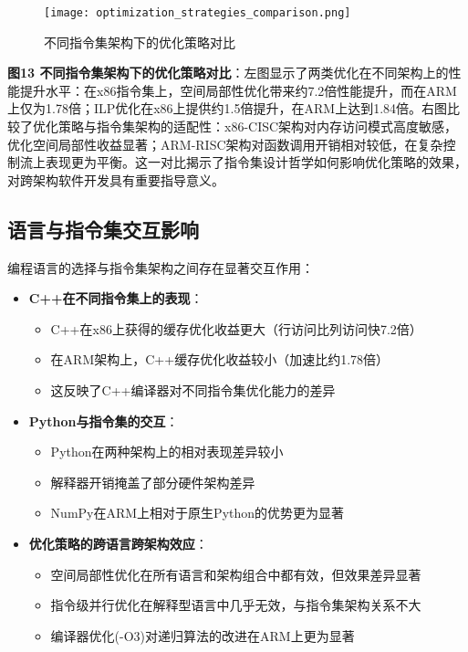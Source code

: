 \documentclass[a4paper,colorlinks=true,linkcolor=blue,urlcolor=blue,citecolor=green,bookmarks=true]{article}
\begin{document}
\begin{figure}[htbp]
  \centering
  \texttt{[image: optimization\_strategies\_comparison.png]}
  \caption{不同指令集架构下的优化策略对比}
  \label{fig:opt_strategies}
\end{figure}

\textbf{图13 不同指令集架构下的优化策略对比}：左图显示了两类优化在不同架构上的性能提升水平：在x86指令集上，空间局部性优化带来约7.2倍性能提升，而在ARM上仅为1.78倍；ILP优化在x86上提供约1.5倍提升，在ARM上达到1.84倍。右图比较了优化策略与指令集架构的适配性：x86-CISC架构对内存访问模式高度敏感，优化空间局部性收益显著；ARM-RISC架构对函数调用开销相对较低，在复杂控制流上表现更为平衡。这一对比揭示了指令集设计哲学如何影响优化策略的效果，对跨架构软件开发具有重要指导意义。

\subsection{语言与指令集交互影响}

编程语言的选择与指令集架构之间存在显著交互作用：

\begin{itemize}
  \item \textbf{C++在不同指令集上的表现}：
  \begin{itemize}
    \item C++在x86上获得的缓存优化收益更大（行访问比列访问快7.2倍）
    \item 在ARM架构上，C++缓存优化收益较小（加速比约1.78倍）
    \item 这反映了C++编译器对不同指令集优化能力的差异
  \end{itemize}
  
  \item \textbf{Python与指令集的交互}：
  \begin{itemize}
    \item Python在两种架构上的相对表现差异较小
    \item 解释器开销掩盖了部分硬件架构差异
    \item NumPy在ARM上相对于原生Python的优势更为显著
  \end{itemize}
  
  \item \textbf{优化策略的跨语言跨架构效应}：
  \begin{itemize}
    \item 空间局部性优化在所有语言和架构组合中都有效，但效果差异显著
    \item 指令级并行优化在解释型语言中几乎无效，与指令集架构关系不大
    \item 编译器优化(-O3)对递归算法的改进在ARM上更为显著
  \end{itemize}
\end{itemize}
\end{document}
